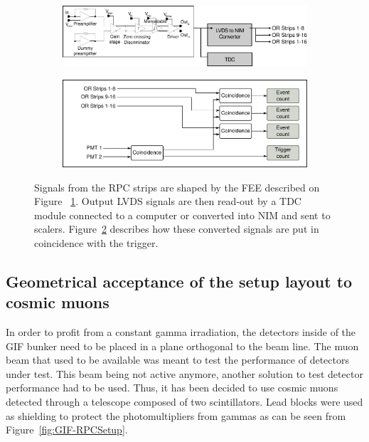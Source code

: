 	\begin{figure}[H]
		\begin{subfigure}{\linewidth}
			\centering
			\includegraphics[width = \plotwidth]{fig/chapt5/pulse-processing.pdf}\\
			\caption{\label{fig:DAQ:A}}
		\end{subfigure}
		\begin{subfigure}{\linewidth}
			\centering
			\includegraphics[width = \plotwidth]{fig/chapt5/pulse-processing-2.pdf}
			\caption{\label{fig:DAQ:B}}
		\end{subfigure}
		\caption{\label{fig:DAQ} Signals from the RPC strips are shaped by the FEE described on Figure ~\ref{fig:DAQ:A}. Output LVDS signals are then read-out by a TDC module connected to a computer or converted into NIM and sent to scalers. Figure~\ref{fig:DAQ:B} describes how these converted signals are put in coincidence with the trigger.}
	\end{figure}
	
	\subsection{Geometrical acceptance of the setup layout to cosmic muons}
	\label{chapt5:ssec:GeoAcc}
				
	In order to profit from a constant gamma irradiation, the detectors inside of the GIF bunker need to be placed in a plane orthogonal to the beam line. The muon beam that used to be available was meant to test the performance of detectors under test. This beam being not active anymore, another solution to test detector performance had to be used. Thus, it has been decided to use cosmic muons detected through a telescope composed of two scintillators. Lead blocks were used as shielding to protect the photomultipliers from gammas as can be seen from Figure~\ref{fig:GIF-RPCSetup}.
				
